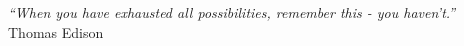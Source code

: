 \cleardoublepage
\thispagestyle{plain}

\vspace*{8cm}

\begin{flushright}
   \textsl{``When you have exhausted all possibilities, remember this - you haven't.''} \\
\vspace*{1.5cm}
           Thomas Edison
\end{flushright}
